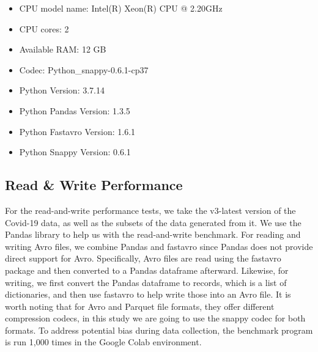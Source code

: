 \begin{itemize}
    \item CPU model name: Intel(R) Xeon(R) CPU @ 2.20GHz
    \item CPU cores: 2
    \item Available RAM: 12 GB
    \item Codec: Python\_snappy-0.6.1-cp37
    \item Python Version: 3.7.14
    \item Python Pandas Version: 1.3.5
    \item Python Fastavro Version: 1.6.1
    \item Python Snappy Version: 0.6.1
\end{itemize}

\subsection{Read \& Write Performance}
\label{read_write_performance}
For the read-and-write performance tests, we take the v3-latest version of the Covid-19 data, as well as the subsets of the data generated from it. We use the Pandas library to help us with the read-and-write benchmark. For reading and writing Avro files, we combine Pandas and fastavro since Pandas does not provide direct support for Avro. Specifically, Avro files are read using the fastavro package and then converted to a Pandas dataframe afterward. Likewise, for writing, we first convert the Pandas dataframe to records, which is a list of dictionaries, and then use fastavro to help write those into an Avro file. It is worth noting that for Avro and Parquet file formats, they offer different compression codecs, in this study we are going to use the snappy codec for both formats. To address potential bias during data collection, the benchmark program is run 1,000 times in the Google Colab environment. 

